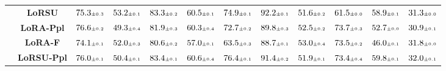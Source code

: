\begin{table}
\begin{center}
\begin{small}
\begin{tabular}{l c c c c c c c c c c c}
& \textbf{LoRSU} & $75.3 \mtiny{\pm 0.3}$ & $53.2 \mtiny{\pm 0.1}$ & $83.3 \mtiny{\pm 0.2}$ & $60.5 \mtiny{\pm 0.1}$ & $74.9 \mtiny{\pm 0.1}$ & $92.2 \mtiny{\pm 0.1}$ & $51.6 \mtiny{\pm 0.2}$ & $61.5 \mtiny{\pm 0.0}$ & $58.9 \mtiny{\pm 0.1}$ & $31.3 \mtiny{\pm 0.0}$ \\
& \textbf{LoRA-Ppl} & $76.6 \mtiny{\pm 0.2}$ & $49.3 \mtiny{\pm 0.4}$ & $81.9 \mtiny{\pm 0.3}$ & $60.3 \mtiny{\pm 0.4}$ & $72.7 \mtiny{\pm 0.2}$ & $89.8 \mtiny{\pm 0.3}$ & $52.5 \mtiny{\pm 0.2}$ & $73.7 \mtiny{\pm 0.3}$ & $52.7 \mtiny{\pm 0.0}$ & $30.9 \mtiny{\pm 0.1}$ \\
& \textbf{LoRA-F} & $74.1 \mtiny{\pm 0.1}$ & $52.0 \mtiny{\pm 0.3}$ & $80.6 \mtiny{\pm 0.2}$ & $57.0 \mtiny{\pm 0.1}$ & $63.5 \mtiny{\pm 0.3}$ & $88.7 \mtiny{\pm 0.1}$ & $53.0 \mtiny{\pm 0.4}$ & $73.5 \mtiny{\pm 0.2}$ & $46.0 \mtiny{\pm 0.1}$ & $31.8 \mtiny{\pm 0.0}$ \\
& \textbf{LoRSU-Ppl} & $76.0 \mtiny{\pm 0.1}$ & $50.4 \mtiny{\pm 0.1}$ & $83.4 \mtiny{\pm 0.1}$ & $60.6 \mtiny{\pm 0.4}$ & $76.4 \mtiny{\pm 0.1}$ & $91.4 \mtiny{\pm 0.2}$ & $51.9 \mtiny{\pm 0.1}$ & $73.4 \mtiny{\pm 0.4}$ & $59.8 \mtiny{\pm 0.1}$ & $32.0 \mtiny{\pm 0.1}$ \\
\bottomrule
\end{tabular}
\endgroup
\end{small}
\end{center}
\vskip -0.1in
\end{table}


